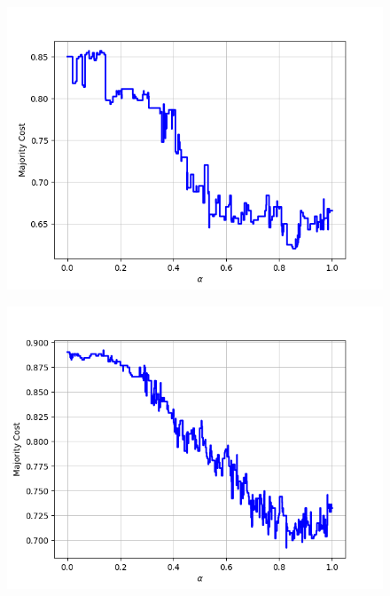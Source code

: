 \begin{figure}[h]
\begin{minipage}{.19\textwidth}
  {\includegraphics[width=\linewidth]{plots/omniglot-intra-ac/Cyrillic}}
\end{minipage}
\begin{minipage}{.19\textwidth}
  \centering
  {\includegraphics[width=\linewidth]{plots/omniglot-intra-ac/Early_Aramaic}}
\end{minipage}
\begin{minipage}{.19\textwidth}
  \centering

\end{minipage}
\end{figure}
